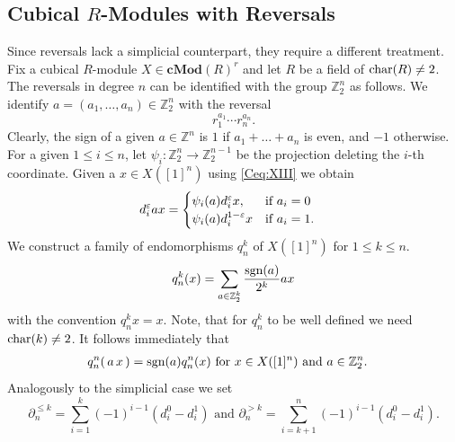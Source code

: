 \documentclass[12pt]{amsart}
\theoremstyle{plain}
\numberwithin{lemma}{\DefaultNumberTheoremWithin}
\numberwithin{claim}{\DefaultNumberTheoremWithin}
\numberwithin{theorem}{\DefaultNumberTheoremWithin}
\numberwithin{corollary}{\DefaultNumberTheoremWithin}
\numberwithin{proposition}{\DefaultNumberTheoremWithin}
\numberwithin{conjecture}{\DefaultNumberTheoremWithin}
\theoremstyle{definition}
\theoremstyle{definition}
\numberwithin{question}{\DefaultNumberTheoremWithin}
\theoremstyle{definition}
\numberwithin{problem}{\DefaultNumberTheoremWithin}
\theoremstyle{remark}
\numberwithin{remark}{\DefaultNumberTheoremWithin}
\theoremstyle{remark}
\numberwithin{example}{\DefaultNumberTheoremWithin}
\def\one{[1]}
\def\kk{{R}}
\def\ve{\varepsilon}
\def\sgn{\textnormal{sgn}}
\def\ZZ{\mathbb Z}
\def\revtowermap{\psi}
\newcommand{\del}{\partial}
\newcommand{\argdelkub}[2]{\del^{#1}_{#2}}
\newcommand{\prev}[2]{q_{#2}^{#1}}
\begin{document}
\subsection{Cubical \texorpdfstring{$R$}--Modules with Reversals} \label{sub:reversal}
Since reversals lack a simplicial counterpart, they require a different treatment.
Fix a cubical $R$-module $X\in \mathbf{cMod}(R)^{r}$ and let $\kk$ be a field of $\textnormal{char}(\kk)\neq 2$. The reversals in degree $n$ can be identified with the group $\ZZ_2^n$ as follows. We identify $a=(a_1,\ldots, a_n)\in\ZZ_2^n$ with the reversal
\[
r_1^{a_1}\cdots r_n^{a_n}.
\]
Clearly, the sign of a given $a\in\ZZ^n$ is $1$ if $a_1+\dots +a_n$ is even, and $-1$ otherwise. For a given $1\leq i\leq n$, let $\revtowermap_i\colon\ZZ_2^n\to \ZZ_2^{n-1}$ be the projection 
deleting the $i$-th coordinate. Given a $x\in X([1]^n)$ using \eqref{Ceq:XIII} we obtain 
\begin{align*} %
d_i^{\ve} a x & = \begin{cases}
    \revtowermap_i(a)d_i^{\ve}  x, & \textnormal{if } a_i=0\\
    \revtowermap_i(a)d_i^{1-\ve}  x & \textnormal{if } a_i=1.
\end{cases}
\end{align*}
We construct a family of endomorphisms $\prev{k}{n}$ of $X([1]^n)$ for $1\leq k\leq n$. 
\begin{align*}
    \prev{k}{n}(x)=\sum_{a\in \ZZ_2^k} \frac{\sgn(a)}{2^k}ax 
\end{align*}
with the convention $\prev{k}{n}x=x$. Note, that for $\prev{k}{n}$ to be well defined we need $\textnormal{char}(k)\neq 2$. It follows immediately that
\begin{align} \label{eq:equivrev}  
  \prev{n}{n}(\,a\,x\,) & = \sgn(a) \prev{n}{n}(x) \text{ for } x \in X(\one^n) \text{ and } a \in \mathbb{Z}_2^n. 
\end{align}
Analogously to the simplicial case we set 
$$\argdelkub{\leq k}{n}=\sum_{i=1}^k (-1)^{i-1}(d_i^0-d_i^1) \text{ and }  \argdelkub{>k}{n}=\sum_{i=k+1}^n (-1)^{i-1}(d_i^0-d_i^1).$$
\end{document}

